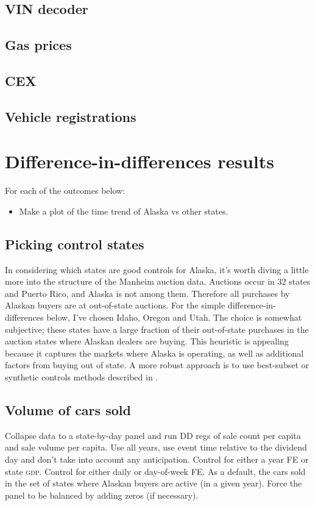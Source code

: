 \documentclass[11pt,letterpaper,oneside]{article}
\newcommand{\gdp}{\textsc{gdp}}
\begin{document}
\subsection{VIN decoder}
\subsection{Gas prices}
\subsection{CEX}
\subsection{Vehicle registrations}


\section[DD Results]{Difference-in-differences results}

For each of the outcomes below:
\begin{itemize}
    \item Make a plot of the time trend of Alaska vs other states.
\end{itemize}


\subsection{Picking control states}
In considering which states are good controls for Alaska, it's worth diving a little more into the structure of the Manheim auction data.
Auctions occur in 32 states and Puerto Rico, and Alaska is not among them.
Therefore all purchases by Alaskan buyers are at out-of-state auctions.
For the simple difference-in-differences below, I've chosen Idaho, Oregon and Utah.
The choice is somewhat subjective; these states have a large fraction of their out-of-state purchases in the auction states where Alaskan dealers are buying.
This heuristic is appealing because it captures the markets where Alaska is operating, as well as additional factors from buying out of state.
A more robust approach is to use best-subset or synthetic controls methods described in \textcite{DoudchenkoImbens2016DD}.




\subsection{Volume of cars sold}
Collapse data to a state-by-day panel and run DD regs of sale count per capita and sale volume per capita.
Use all years, use event time relative to the dividend day and don't take into account any anticipation.
Control for either a year FE or state \gdp{}. Control for either daily or day-of-week FE.
As a default, the cars sold in the set of states where Alaskan buyers are active (in a given year).
Force the panel to be balanced by adding zeros (if necessary).
\end{document}
